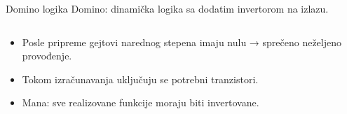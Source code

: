 \begin{frame}[label=09_3-s071]{Domino logika}
Domino: \alert{dinamička logika sa dodatim invertorom na izlazu}.
\begin{columns}[c,onlytextwidth]
\begin{center}

\end{center}
\begin{center}

\end{center}
\end{columns}\begin{itemize}
\item Posle pripreme gejtovi narednog stepena imaju nulu → sprečeno neželjeno provođenje.
\item Tokom izračunavanja uključuju se potrebni tranzistori.
\item Mana: sve realizovane funkcije moraju biti invertovane.
\end{itemize}
\end{frame}
